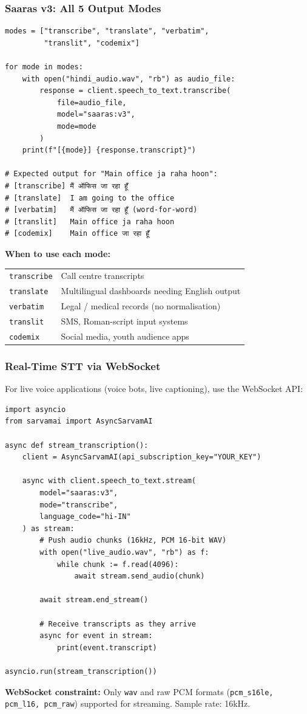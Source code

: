 \begin{frame}[fragile]\frametitle{Saaras v3: All 5 Output Modes}
\begin{lstlisting}
modes = ["transcribe", "translate", "verbatim",
         "translit", "codemix"]

for mode in modes:
    with open("hindi_audio.wav", "rb") as audio_file:
        response = client.speech_to_text.transcribe(
            file=audio_file,
            model="saaras:v3",
            mode=mode
        )
    print(f"[{mode}] {response.transcript}")

# Expected output for "Main office ja raha hoon":
# [transcribe] मैं ऑफिस जा रहा हूँ
# [translate]  I am going to the office
# [verbatim]   मैं ऑफिस जा रहा हूँ (word-for-word)
# [translit]   Main office ja raha hoon
# [codemix]    Main office जा रहा हूँ
\end{lstlisting}

\textbf{When to use each mode:}
\begin{center}
\begin{tabular}{ll}
\texttt{transcribe} & Call centre transcripts \\
\texttt{translate} & Multilingual dashboards needing English output \\
\texttt{verbatim} & Legal / medical records (no normalisation) \\
\texttt{translit} & SMS, Roman-script input systems \\
\texttt{codemix} & Social media, youth audience apps \\
\end{tabular}
\end{center}
\end{frame}

\begin{frame}[fragile]\frametitle{Real-Time STT via WebSocket}
For live voice applications (voice bots, live captioning), use the WebSocket API:
\begin{lstlisting}
import asyncio
from sarvamai import AsyncSarvamAI

async def stream_transcription():
    client = AsyncSarvamAI(api_subscription_key="YOUR_KEY")

    async with client.speech_to_text.stream(
        model="saaras:v3",
        mode="transcribe",
        language_code="hi-IN"
    ) as stream:
        # Push audio chunks (16kHz, PCM 16-bit WAV)
        with open("live_audio.wav", "rb") as f:
            while chunk := f.read(4096):
                await stream.send_audio(chunk)

        await stream.end_stream()

        # Receive transcripts as they arrive
        async for event in stream:
            print(event.transcript)

asyncio.run(stream_transcription())
\end{lstlisting}
\textbf{WebSocket constraint:} Only \texttt{wav} and raw PCM formats (\texttt{pcm\_s16le, pcm\_l16, pcm\_raw}) supported for streaming. Sample rate: 16kHz.
\end{frame}


